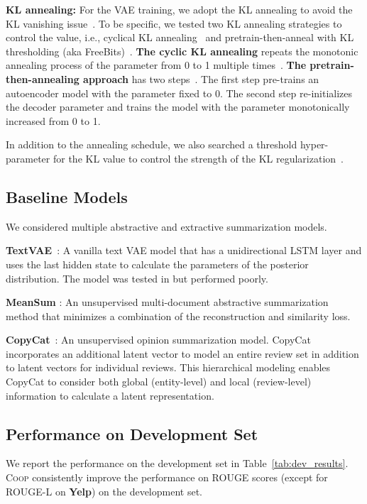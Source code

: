 \documentclass[11pt]{article}
\newcommand{\aggname}{\textsc{Coop}}
\newcommand{\vaeorig}{TextVAE}
\newcommand{\yelp}{\mbox{\bf Yelp}}
\begin{document}
\noindent
{\bf KL annealing:}
For the VAE training, we adopt the KL annealing to avoid the KL vanishing issue~\cite{bowman-etal-2016-generating}.
To be specific, we tested two KL annealing strategies to control the  value, i.e., cyclical KL annealing~\cite{fu-etal-2019-cyclical} and pretrain-then-anneal with KL thresholding (aka FreeBits)~\cite{kingma2016improved,li-etal-2019-surprisingly}.
{\bf The cyclic KL annealing} repeats the monotonic annealing process of the  parameter from 0 to 1 multiple times~\cite{fu-etal-2019-cyclical}.
{\bf The pretrain-then-annealing approach} has two steps~\cite{li-etal-2019-surprisingly}. The first step pre-trains an autoencoder model with the  parameter fixed to 0.
The second step re-initializes the decoder parameter and trains the model with the  parameter monotonically increased from 0 to 1.

In addition to the annealing schedule, we also searched a threshold hyper-parameter for the KL value to control the strength of the KL regularization~\cite{kingma2016improved}.

\subsection{Baseline Models}
\label{app:baselines}
We considered multiple abstractive and extractive summarization models. 

\noindent
{\bf \vaeorig}~\cite{bowman-etal-2016-generating}: A vanilla text VAE model that has a unidirectional LSTM layer and uses the last hidden state to calculate the parameters of the posterior distribution. The model was tested in \citet{brazinskas-etal-2020-unsupervised} but performed poorly.

\noindent
{\bf MeanSum} \cite{Chu:2019:MeanSum}: An unsupervised multi-document abstractive summarization method that minimizes a combination of the reconstruction and similarity loss.

\noindent
{\bf CopyCat}~\cite{brazinskas-etal-2020-unsupervised}: An unsupervised opinion summarization model. CopyCat incorporates an additional latent vector  to model an entire review set  in addition to latent vectors for individual reviews.
This hierarchical modeling enables CopyCat to consider both global (entity-level) and local (review-level) information to calculate a latent representation.

\subsection{Performance on Development Set}
We report the performance on the development set in Table~\ref{tab:dev_results}.
\aggname{} consistently improve the performance on ROUGE scores (except for ROUGE-L on \yelp) on the development set.
\end{document}
